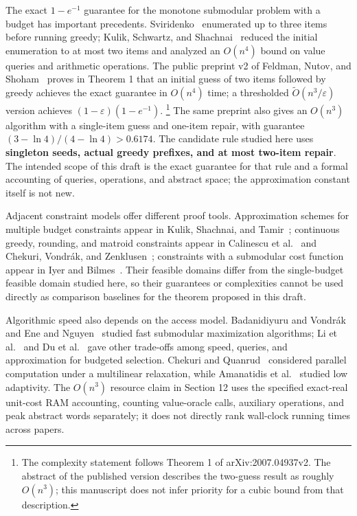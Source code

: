 \documentclass[11pt,a4paper]{article}
\begin{document}
The exact $1-e^{-1}$ guarantee for the monotone submodular problem with a budget has important precedents.
Sviridenko~\cite{sviridenko2004} enumerated up to three items before running greedy;
Kulik, Schwartz, and Shachnai~\cite{kulik2021} reduced the initial enumeration to at most two items and analyzed an $O(n^4)$ bound on value queries and arithmetic operations.
The public preprint v2 of Feldman, Nutov, and Shoham~\cite{feldman2021} proves in Theorem 1 that
an initial guess of two items followed by greedy achieves the exact guarantee in $O(n^4)$ time; a thresholded
$\widetilde O(n^3/\varepsilon)$ version achieves $(1-\varepsilon)(1-e^{-1})$.
\footnote{The complexity statement follows Theorem 1 of arXiv:2007.04937v2. The abstract of the published version describes the two-guess result as roughly $O(n^3)$; this manuscript does not infer priority for a cubic bound from that description.}
The same preprint also gives an $O(n^3)$ algorithm with a single-item guess and one-item repair, with guarantee
$(3-\ln 4)/(4-\ln 4)>0.6174$.
The candidate rule studied here uses \textbf{singleton seeds, actual greedy prefixes, and at most two-item repair}.
The intended scope of this draft is the exact guarantee for that rule and a formal accounting of queries, operations, and abstract space;
the approximation constant itself is not new.

Adjacent constraint models offer different proof tools.
Approximation schemes for multiple budget constraints appear in Kulik, Shachnai, and Tamir~\cite{kulik2009};
continuous greedy, rounding, and matroid constraints appear in Calinescu et al.~\cite{calinescu2011} and
Chekuri, Vondr\'ak, and Zenklusen~\cite{chekuri2014};
constraints with a submodular cost function appear in Iyer and Bilmes~\cite{iyer2013}.
Their feasible domains differ from the single-budget feasible domain studied here, so their guarantees or complexities cannot be used directly as comparison baselines for the theorem proposed in this draft.

Algorithmic speed also depends on the access model.
Badanidiyuru and Vondr\'ak~\cite{badanidiyuru2014} and Ene and Nguyen~\cite{ene2019}
studied fast submodular maximization algorithms; Li et al.~\cite{li2022} and Du et al.~\cite{du2024}
gave other trade-offs among speed, queries, and approximation for budgeted selection.
Chekuri and Quanrud~\cite{chekuriquanrud2019} considered parallel computation under a multilinear relaxation,
while Amanatidis et al.~\cite{amanatidis2021adaptive} studied low adaptivity.
The $O(n^3)$ resource claim in Section 12 uses the specified exact-real unit-cost RAM accounting,
counting value-oracle calls, auxiliary operations, and peak abstract words separately; it does not directly rank wall-clock running times across papers.
\end{document}
